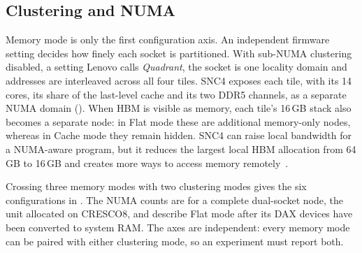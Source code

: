 \subsection{Clustering and NUMA}
\label{sec:hbm-clustering}

Memory mode is only the first configuration axis.  An independent
firmware setting decides how finely each socket is partitioned.  With
sub-NUMA clustering disabled, a setting Lenovo calls \emph{Quadrant},
the socket is one locality domain and addresses are interleaved across
all four tiles.  SNC4 exposes each tile, with its 14 cores, its share of
the last-level cache and its two DDR5 channels, as a separate NUMA domain
().  When HBM is visible as memory, each tile's
16\,GB stack also becomes a separate node: in Flat mode these are
additional memory-only nodes, whereas in Cache mode they remain hidden.
SNC4 can raise local bandwidth for a NUMA-aware program, but it reduces
the largest local HBM allocation from 64\,GB to 16\,GB and creates more
ways to access memory remotely~\cite{lp1738,intelmaxtuning}.

Crossing three memory modes with two clustering modes gives the six
configurations in .  The NUMA counts
are for a complete dual-socket node, the unit allocated on CRESCO8, and
describe Flat mode after its DAX devices have been converted to system
RAM.  The axes are independent: every memory mode can be paired with
either clustering mode, so an experiment must report both.

